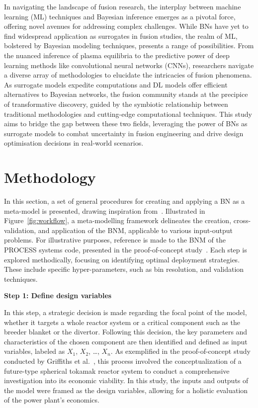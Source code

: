 \documentclass[journal]{IEEEtran}
\begin{document}
In navigating the landscape of fusion research, the interplay between machine learning (ML) techniques and Bayesian inference emerges as a pivotal force, offering novel avenues for addressing complex challenges. While BNs have yet to find widespread application as surrogates in fusion studies, the realm of ML, bolstered by Bayesian modeling techniques, presents a range of possibilities. From the nuanced inference of plasma equilibria to the predictive power of deep learning methods like convolutional neural networks (CNNs), researchers navigate a diverse array of methodologies to elucidate the intricacies of fusion phenomena. As surrogate models expedite computations and DL models offer efficient alternatives to Bayesian networks, the fusion community stands at the precipice of transformative discovery, guided by the symbiotic relationship between traditional methodologies and cutting-edge computational techniques. This study aims to bridge the gap between these two fields, leveraging the power of BNs as surrogate models to combat uncertainty in fusion engineering and drive design optimisation decisions in real-world scenarios.

\section{Methodology}\label{sec:methodology}

In this section, a set of general procedures for creating and applying a BN as a meta-model is presented, drawing inspiration from~\cite{Conti2019}. Illustrated in Figure~\ref{fig:workflow}, a meta-modelling framework delineates the creation, cross-validation, and application of the BNM, applicable to various input-output problems. For illustrative purposes, reference is made to the BNM of the PROCESS systems code, presented in the proof-of-concept study~\cite{Griffiths2024}. Each step is explored methodically, focusing on identifying optimal deployment strategies. These include specific hyper-parameters, such as bin resolution, and validation techniques. 

\textbf{Step 1: Define design variables}

In this step, a strategic decision is made regarding the focal point of the model, whether it targets a whole reactor system or a critical component such as the breeder blanket or the divertor. Following this decision, the key parameters and characteristics of the chosen component are then identified and defined as input variables, labeled as $X_1$, $X_2$, \ldots, $X_n$. As exemplified in the proof-of-concept study conducted by Griffiths et al.~\cite{Griffiths2024}, this process involved the conceptualization of a future-type spherical tokamak reactor system to conduct a comprehensive investigation into its economic viability. In this study, the inputs and outputs of the model were framed as the design variables, allowing for a holistic evaluation of the power plant's economics.
\end{document}
